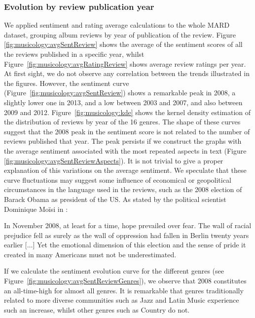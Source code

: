\subsubsection{Evolution by review publication year}
\label{sec:musicology:evolution-review}

We applied sentiment and rating average calculations to the whole MARD dataset, grouping album reviews by year of publication of the review. Figure \ref{fig:musicology:avgSentReview} shows the average of the sentiment scores of all the reviews published in a specific year, whilst Figure~\ref{fig:musicology:avgRatingReview} shows average review ratings per year. At first sight, we do not observe any correlation between the trends illustrated in the figures. However, the sentiment curve (Figure~\ref{fig:musicology:avgSentReview}) shows a remarkable peak in 2008, a slightly lower one in 2013, and a low between 2003 and 2007, and also between 2009 and 2012. Figure~\ref{fig:musicology:kde} shows the kernel density estimation of the distribution of reviews by year of the 16 genres. The shape of these curves suggest that the 2008 peak in the sentiment score is not related to the number of reviews published that year. The peak persists if we construct the graphs with the average sentiment associated with the most repeated aspects in text (Figure \ref{fig:musicology:avgSentReviewAspects}). 
It is not trivial to give a proper explanation of this variations on the average sentiment. We speculate that these curve fluctuations may suggest some influence of economical or geopolitical circumstances in the language used in the reviews, such as the 2008 election of Barack Obama as president of the US. As stated by the political scientist Dominique Mo\"{i}si in \cite{Moisi2010}:

\begin{displayquote}\small{
In November 2008, at least for a time, hope prevailed over fear. The wall of racial prejudice fell as surely as the wall of oppression had fallen in Berlin twenty years earlier [...] Yet the emotional dimension of this election and the sense of pride it created in many Americans must not be underestimated.}
\end{displayquote}

If we calculate the sentiment evolution curve for the different genres (see Figure~\ref{fig:musicology:avgSentReviewGenres}), we observe that 2008 constitutes an all-time-high for almost all genres. It is remarkable that genres traditionally related to more diverse communities such as Jazz and Latin Music experience such an increase, whilst other genres such as Country do not.

